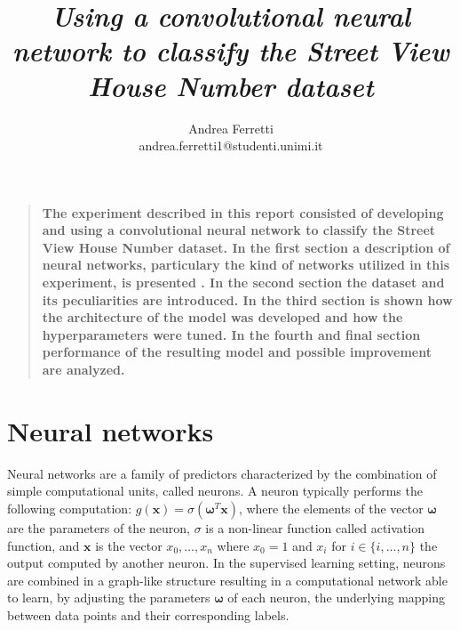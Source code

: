 \documentclass[12pt]{article}
\title{{\it Using a convolutional neural network to classify the Street View House Number dataset}}
\author
{Andrea Ferretti\\
\normalsize{andrea.ferretti1@studenti.unimi.it}
}
\date{}
\newenvironment{sciabstract}{%
\begin{quote} \bf}
{\end{quote}}
\newcommand{\vect}[1]{\boldsymbol{#1}}
\begin{document}
 


\baselineskip24pt


\maketitle 

\begin{sciabstract}
The experiment described in this report consisted of developing and using a convolutional neural network to classify the Street View House Number dataset. In the first section a description of neural networks, particulary the kind of networks utilized in this experiment,  is presented . In the second section the dataset and its peculiarities are introduced. In the third section is shown how the architecture of the model was developed and how the hyperparameters were tuned. In the fourth and final section performance of the resulting model and possible improvement are analyzed.
\end{sciabstract}

\section*{Neural networks}
Neural networks are a family of predictors characterized by the combination of simple computational units, called neurons.
A neuron typically performs the following computation: $ g(\vect{x}) = \sigma(\vect{\omega}^T \vect{x}) $, where the elements of the vector $\vect{\omega}$ are the parameters of the neuron, $\sigma$ is a non-linear function called activation function, and $\vect{x}$ is the vector $x_0,\ldots,x_n $ where $ x_0 = 1$ and $x_i$ for $i \in \{i,\ldots,n\}$  the output computed by another neuron.
In the supervised learning setting, neurons are combined in a graph-like structure resulting in a computational network able to learn, by adjusting the parameters $\vect{\omega}$ of each neuron, the underlying mapping between data points and their corresponding labels.
\end{document}
